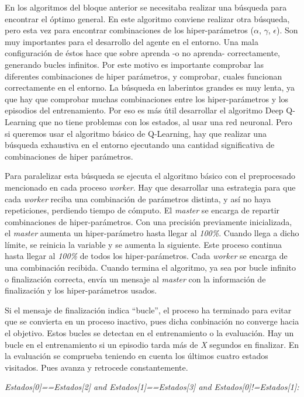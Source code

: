 		
			
		En los algoritmos del bloque anterior se necesitaba realizar una búsqueda para encontrar el óptimo general. En este algoritmo conviene realizar otra búsqueda, pero esta vez para encontrar combinaciones de los hiper-parámetros ($\alpha$, $\gamma$, $\epsilon$). Son muy importantes para el desarrollo del agente en el entorno. Una mala configuración de éstos hace que sobre aprenda -o no aprenda- correctamente, generando bucles infinitos. Por este motivo es importante comprobar las diferentes combinaciones de hiper parámetros, y comprobar, cuales funcionan correctamente en el entorno. La búsqueda en laberintos grandes es muy lenta, ya que hay que comprobar muchas combinaciones entre los hiper-parámetros y los episodios del entrenamiento. Por eso es más útil desarrollar el algoritmo Deep Q-Learning que no tiene problemas con los estados, al usar una red neuronal. Pero si queremos usar el algoritmo básico de Q-Learning, hay que realizar una búsqueda exhaustiva en el entorno ejecutando una cantidad significativa de combinaciones de hiper parámetros.

		Para paralelizar esta búsqueda se ejecuta el algoritmo básico con el preprocesado mencionado en cada proceso \textit{worker}. Hay que desarrollar una estrategia para que cada \textit{worker} reciba una combinación de parámetros distinta, y así no haya repeticiones, perdiendo tiempo de cómputo. El \textit{master} se encarga de repartir combinaciones de hiper-parámetros. Con una precisión previamente inicializada, el \textit{master} aumenta un hiper-parámetro hasta llegar al \textit{100\%}. Cuando llega a dicho límite, se reinicia la variable y se aumenta la siguiente. Este proceso continua hasta llegar al \textit{100\%} de todos los hiper-parámetros. Cada \textit{worker} se encarga de una combinación recibida. Cuando termina el algoritmo, ya sea por bucle infinito o finalización correcta, envía un mensaje al \textit{master} con la información de finalización y los hiper-parámetros usados.
		
		Si el mensaje de finalización indica ``bucle'', el proceso ha terminado para evitar que se convierta en un proceso inactivo, pues dicha conbinación no converge hacia el objetivo. Estos bucles se detectan en el entrenamiento o la evaluación. Hay un bucle en el entrenamiento si un episodio tarda más de \textit{X} segundos en finalizar. En la evaluación se comprueba teniendo en cuenta los últimos cuatro estados visitados. Pues avanza y retrocede constantemente. 
		\begin{center}
			\textit{Estados[0]==Estados[2] and Estados[1]==Estados[3] and Estados[0]!=Estados[1]: }
		\end{center}
		
